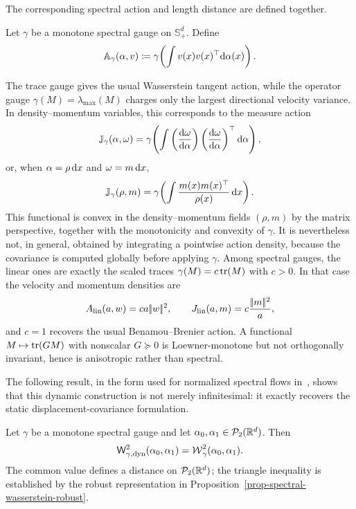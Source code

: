The corresponding spectral action and length distance are defined together.
\begin{defn}\label{def-dynamic-spectral-wasserstein}
Let $\gamma$ be a monotone spectral gauge on $\mathbb S_+^d$. Define
\begin{equation}\label{eq-spectral-tangent-action}
	\mathbb A_\gamma(\alpha,v)
	\coloneqq
	\gamma\!\left(\int v(x)v(x)^\top\mathrm{d}\alpha(x)\right).
\end{equation}
\end{defn}
The trace gauge gives the usual Wasserstein tangent action, while the operator gauge $\gamma(M)=\lambda_{\max}(M)$ charges only the largest directional velocity variance.
In density--momentum variables, this corresponds to the measure action
\[
	\mathbb J_\gamma(\alpha,\omega)
	=
	\gamma\!\left(\int
	\left(\frac{\mathrm{d}\omega}{\mathrm{d}\alpha}\right)
	\left(\frac{\mathrm{d}\omega}{\mathrm{d}\alpha}\right)^\top
	\mathrm{d}\alpha\right),
\]
or, when \(\alpha=\rho\,\mathrm{d} x\) and \(\omega=m\,\mathrm{d} x\),
\[
	\mathbb J_\gamma(\rho,m)
	=
	\gamma\!\left(\int \frac{m(x)m(x)^\top}{\rho(x)}\,\mathrm{d} x\right).
\]
This functional is convex in the density--momentum fields \((\rho,m)\) by the matrix perspective, together with the monotonicity and convexity of \(\gamma\). It is nevertheless not, in general, obtained by integrating a pointwise action density, because the covariance is computed globally before applying \(\gamma\). Among spectral gauges, the linear ones are exactly the scaled traces $\gamma(M)=c\operatorname{tr}(M)$ with $c>0$. In that case the velocity and momentum densities are
\[
	A_{\mathrm{lin}}(a,w)=ca|\!| w |\!|^2,
	\qquad
	J_{\mathrm{lin}}(a,m)=c\frac{|\!| m |\!|^2}{a},
\]
and $c=1$ recovers the usual Benamou--Brenier action. A functional $M\mapsto\operatorname{tr}(GM)$ with nonscalar $G\succeq0$ is Loewner-monotone but not orthogonally invariant, hence is anisotropic rather than spectral.

The following result, in the form used for normalized spectral flows in~\cite{peyre2026muon}, shows that this dynamic construction is not merely infinitesimal: it exactly recovers the static displacement-covariance formulation.

\begin{prop}\label{prop-static-dynamic-spectral-wasserstein}
	Let $\gamma$ be a monotone spectral gauge and let $\alpha_0,\alpha_1\in\mathcal{P}_2(\mathbb{R}^d)$. Then
	\[
		\mathsf W_{\gamma,\mathrm{dyn}}^2(\alpha_0,\alpha_1)
		=
		\operatorname{\mathcal{W}}_\gamma^2(\alpha_0,\alpha_1).
	\]
	The common value defines a distance on $\mathcal{P}_2(\mathbb{R}^d)$; the triangle inequality is established by the robust representation in Proposition~\ref{prop-spectral-wasserstein-robust}.
\end{prop}

